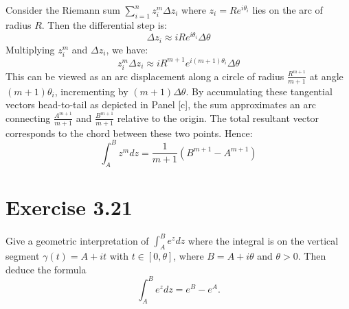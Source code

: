 \documentclass{article}
\begin{document}
\begin{solution}
\begin{center}
  \end{center}

  \vspace{1em}
  Consider the Riemann sum $\sum_{i=1}^{n} z_i^m \Delta z_i$ where
  $z_i = Re^{i\theta_i}$ lies on the arc of radius $R$. Then the
  differential step is:
  \[
    \Delta z_i \approx iRe^{i\theta_i}\Delta\theta
  \]
  Multiplying $z_i^m$ and $\Delta z_i$, we have:
  \[
    z_i^m \Delta z_i \approx iR^{m+1}e^{i(m+1)\theta_i}\Delta\theta
  \]
  This can be viewed as an arc displacement along a circle of radius
  $\frac{R^{m+1}}{m+1}$ at angle $(m+1)\theta_i$, incrementing by
  $(m+1)\Delta\theta$. By accumulating these tangential vectors
  head-to-tail as depicted in Panel [c], the sum approximates an arc
  connecting $\frac{A^{m+1}}{m+1}$ and $\frac{B^{m+1}}{m+1}$ relative
  to the origin. The total resultant vector corresponds to the chord
  between these two points. Hence:
  \[
    \int_A^B z^m dz = \frac{1}{m+1}(B^{m+1} - A^{m+1})
  \]

\end{solution}

\section{Exercise 3.21}

Give a geometric interpretation of $\int_A^B e^z dz$ where the
integral is on the vertical segment $\gamma(t) = A + it$ with $t \in
[0, \theta]$, where $B = A + i\theta$ and $\theta > 0$. Then deduce the formula
\[
  \int_A^B e^z dz = e^B - e^A.
\]
\end{document}
